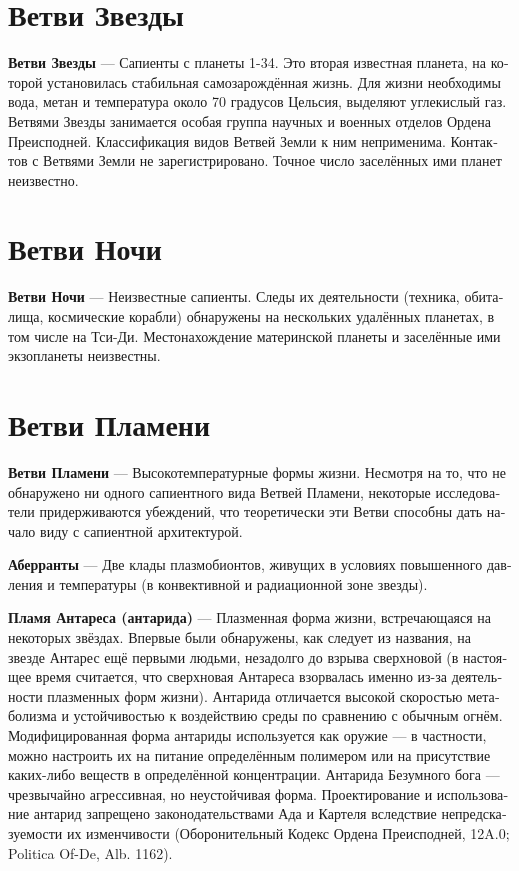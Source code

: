 \documentclass[a4paper,12pt,fleqn]{book}\usepackage{cooltooltips}\usepackage{polyglossia}\setdefaultlanguage[babelshorthands=true]{russian}\setotherlanguage{english}\defaultfontfeatures{Ligatures=TeX,Mapping=tex-text} \usepackage{xcolor}\definecolor{lightgray}{HTML}{bbbbbb}\color{lightgray}\newcommand{\ml}[3]{\textenglish{\textcolor{black}{#3}}}
\newcommand{\asterism}{\vspace{1em}{\centering\Large\bfseries$\ast~\ast~\ast$\par}\vspace{1em}}
\newcommand{\theterm}[3]{\textbf{\hypertarget{#1}{#2}} --- #3}
\begin{document}
\section{Ветви Звезды}

\theterm{star-forks} %
{Ветви Звезды}
{Сапиенты с планеты 1-34.
Это вторая известная планета, на которой установилась стабильная самозарождённая жизнь.
Для жизни необходимы вода, метан и температура около 70 градусов Цельсия, выделяют углекислый газ.
Ветвями Звезды занимается особая группа научных и военных отделов Ордена Преисподней.
Классификация видов Ветвей Земли к ним неприменима.
Контактов с Ветвями Земли не зарегистрировано.
Точное число заселённых ими планет неизвестно.}

\section{Ветви Ночи}

\theterm{night-forks} %
{Ветви Ночи}
{Неизвестные сапиенты.
Следы их деятельности (техника, обиталища, космические корабли) обнаружены на нескольких удалённых планетах, в том числе на Тси-Ди.
Местонахождение материнской планеты и заселённые ими экзопланеты неизвестны.}

\section{Ветви Пламени}

\theterm{flame-forks}
{Ветви Пламени}
{Высокотемпературные формы жизни.
Несмотря на то, что не обнаружено ни одного сапиентного вида Ветвей Пламени, некоторые исследователи придерживаются убеждений, что теоретически эти Ветви способны дать начало виду с сапиентной архитектурой.}

\asterism

\theterm{aberrants}
{Аберранты}
{Две клады плазмобионтов, живущих в условиях повышенного давления и температуры (в конвективной и радиационной зоне звезды).}

\theterm{flame-of-antares} %
{Пламя Антареса (антарида)}
{Плазменная форма жизни, встречающаяся на некоторых звёздах.
Впервые были обнаружены, как следует из названия, на звезде Антарес ещё первыми людьми, незадолго до взрыва сверхновой (в настоящее время считается, что сверхновая Антареса взорвалась именно из-за деятельности плазменных форм жизни).
Антарида отличается высокой скоростью метаболизма и устойчивостью к воздействию среды по сравнению с обычным огнём.
Модифицированная форма антариды используется как оружие --- в частности, можно настроить их на питание определённым полимером или на присутствие каких-либо веществ в определённой концентрации.
Антарида Безумного бога --- чрезвычайно агрессивная, но неустойчивая форма.
Проектирование и использование антарид запрещено законодательствами Ада и Картеля вследствие непредсказуемости их изменчивости (Оборонительный Кодекс Ордена Преисподней, 12A.0; Politica Of-De, Alb. 1162).}
\end{document}
